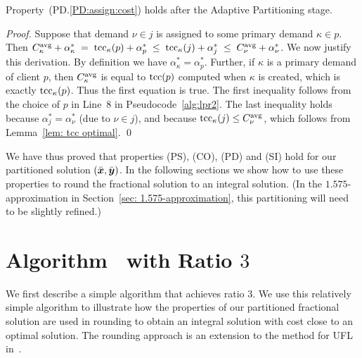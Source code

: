 \documentclass{llncs}
\begin{document}
\begin{lemma}\label{lem: PD:assign:cost holds}
Property~(PD.\ref{PD:assign:cost}) holds after the Adaptive Partitioning stage.
\end{lemma}

\begin{proof}
Suppose that demand $\nu\in j$ is assigned to some primary demand $\kappa\in p$.
Then
$C^{{\mbox{\scriptsize\rm avg}}}_{\kappa} + \alpha_{\kappa}^\ast \;=\; \textrm{tcc}_\kappa(p) + \alpha^\ast_p
 					\;\le\; \textrm{tcc}_\kappa(j) + \alpha^\ast_j   
					\;\le\; C^{{\mbox{\scriptsize\rm avg}}}_{\nu} + \alpha^\ast_\nu$.
We now justify this derivation. By definition we have
$\alpha_{\kappa}^\ast = \alpha^\ast_p$.  Further,
if $\kappa$ is a primary demand of client $p$,
then $C^{{\mbox{\scriptsize\rm avg}}}_{\kappa}$ is equal to $\textrm{tcc}(p)$ computed when
$\kappa$ is created, which is exactly $\textrm{tcc}_\kappa(p)$. Thus
the first equation is true. The first inequality follows
from the choice of $p$ in Line~8 in
Pseudocode~\ref{alg:lpr2}. The last inequality holds
because $\alpha^\ast_j = \alpha^\ast_\nu$ (due to $\nu\in
j$), and because $\textrm{tcc}_\kappa(j) \le C^{{\mbox{\scriptsize\rm avg}}}_{\nu}$, which
follows from Lemma~\ref{lem: tcc optimal}.
\qed
\end{proof}

We have thus proved that properties (PS), (CO), (PD) and (SI) hold
for our partitioned solution $(\bar{\boldsymbol{x}},\bar{\boldsymbol{y}})$. In the
following sections we show how to use these properties to round the
fractional solution to an integral solution. 
(In the $1.575$-approximation in Section~\ref{sec:
  1.575-approximation}, this partitioning will need to be slightly
refined.)


\section{Algorithm~{\EGUP} with Ratio $3$}
\label{sec: 3-approximation}

We first describe a simple algorithm that achieves ratio $3$. We use
this relatively simple algorithm to illustrate how the properties of
our partitioned fractional solution are used in rounding to obtain an
integral solution with cost close to an optimal solution. The rounding
approach is an extension to the method for UFL in~\cite{gupta08}.
\end{document}
